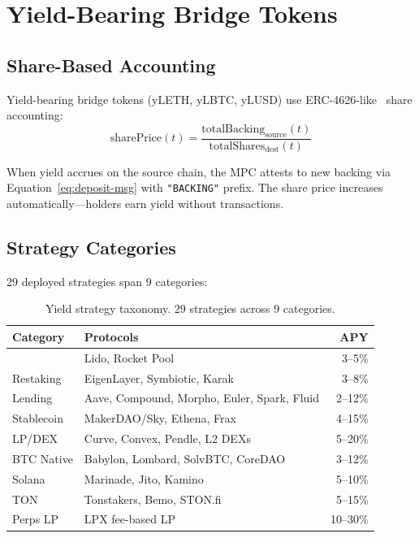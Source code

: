 \section{Yield-Bearing Bridge Tokens}

\label{sec:yield}

\subsection{Share-Based Accounting}

Yield-bearing bridge tokens (yLETH, yLBTC, yLUSD) use ERC-4626-like~\cite{erc4626} share accounting:
\begin{equation}
  \text{sharePrice}(t) = \frac{\text{totalBacking}_{\text{source}}(t)}{\text{totalShares}_{\text{dest}}(t)}
\end{equation}

When yield accrues on the source chain, the MPC attests to new backing via Equation~\eqref{eq:deposit-msg} with \texttt{"BACKING"} prefix. The share price increases automatically---holders earn yield without transactions.

\subsection{Strategy Categories}

29 deployed strategies span 9 categories:

\begin{table}[h]
\centering
\scriptsize
\begin{tabular}{llr}
\toprule
\textbf{Category} & \textbf{Protocols} & \textbf{APY} \\
\midrule
 & Lido, Rocket Pool & 3--5\% \\
Restaking & EigenLayer, Symbiotic, Karak & 3--8\% \\
Lending & Aave, Compound, Morpho, Euler, Spark, Fluid & 2--12\% \\
Stablecoin & MakerDAO/Sky, Ethena, Frax & 4--15\% \\
LP/DEX & Curve, Convex, Pendle, L2 DEXs & 5--20\% \\
BTC Native & Babylon, Lombard, SolvBTC, CoreDAO & 3--12\% \\
Solana & Marinade, Jito, Kamino & 5--10\% \\
TON & Tonstakers, Bemo, STON.fi & 5--15\% \\
Perps LP & LPX fee-based LP & 10--30\% \\
\bottomrule
\end{tabular}
\caption{Yield strategy taxonomy. 29 strategies across 9 categories.}
\label{tab:strategies}
\end{table}

